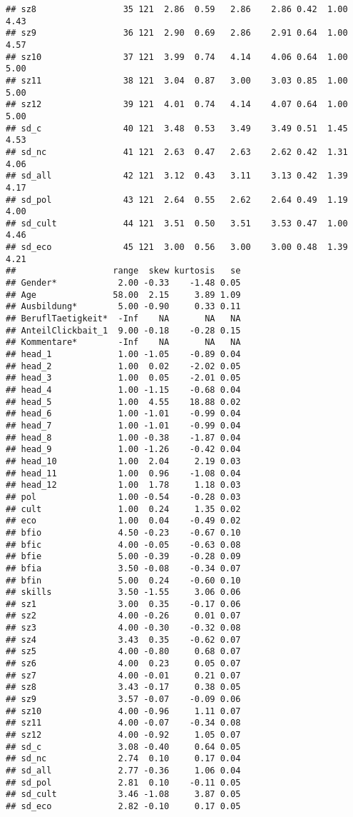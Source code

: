 \documentclass[]{article}
\begin{document}
\begin{verbatim}
## sz8                 35 121  2.86  0.59   2.86    2.86 0.42  1.00  4.43
## sz9                 36 121  2.90  0.69   2.86    2.91 0.64  1.00  4.57
## sz10                37 121  3.99  0.74   4.14    4.06 0.64  1.00  5.00
## sz11                38 121  3.04  0.87   3.00    3.03 0.85  1.00  5.00
## sz12                39 121  4.01  0.74   4.14    4.07 0.64  1.00  5.00
## sd_c                40 121  3.48  0.53   3.49    3.49 0.51  1.45  4.53
## sd_nc               41 121  2.63  0.47   2.63    2.62 0.42  1.31  4.06
## sd_all              42 121  3.12  0.43   3.11    3.13 0.42  1.39  4.17
## sd_pol              43 121  2.64  0.55   2.62    2.64 0.49  1.19  4.00
## sd_cult             44 121  3.51  0.50   3.51    3.53 0.47  1.00  4.46
## sd_eco              45 121  3.00  0.56   3.00    3.00 0.48  1.39  4.21
##                   range  skew kurtosis   se
## Gender*            2.00 -0.33    -1.48 0.05
## Age               58.00  2.15     3.89 1.09
## Ausbildung*        5.00 -0.90     0.33 0.11
## BeruflTaetigkeit*  -Inf    NA       NA   NA
## AnteilClickbait_1  9.00 -0.18    -0.28 0.15
## Kommentare*        -Inf    NA       NA   NA
## head_1             1.00 -1.05    -0.89 0.04
## head_2             1.00  0.02    -2.02 0.05
## head_3             1.00  0.05    -2.01 0.05
## head_4             1.00 -1.15    -0.68 0.04
## head_5             1.00  4.55    18.88 0.02
## head_6             1.00 -1.01    -0.99 0.04
## head_7             1.00 -1.01    -0.99 0.04
## head_8             1.00 -0.38    -1.87 0.04
## head_9             1.00 -1.26    -0.42 0.04
## head_10            1.00  2.04     2.19 0.03
## head_11            1.00  0.96    -1.08 0.04
## head_12            1.00  1.78     1.18 0.03
## pol                1.00 -0.54    -0.28 0.03
## cult               1.00  0.24     1.35 0.02
## eco                1.00  0.04    -0.49 0.02
## bfio               4.50 -0.23    -0.67 0.10
## bfic               4.00 -0.05    -0.63 0.08
## bfie               5.00 -0.39    -0.28 0.09
## bfia               3.50 -0.08    -0.34 0.07
## bfin               5.00  0.24    -0.60 0.10
## skills             3.50 -1.55     3.06 0.06
## sz1                3.00  0.35    -0.17 0.06
## sz2                4.00 -0.26     0.01 0.07
## sz3                4.00 -0.30    -0.32 0.08
## sz4                3.43  0.35    -0.62 0.07
## sz5                4.00 -0.80     0.68 0.07
## sz6                4.00  0.23     0.05 0.07
## sz7                4.00 -0.01     0.21 0.07
## sz8                3.43 -0.17     0.38 0.05
## sz9                3.57 -0.07    -0.09 0.06
## sz10               4.00 -0.96     1.11 0.07
## sz11               4.00 -0.07    -0.34 0.08
## sz12               4.00 -0.92     1.05 0.07
## sd_c               3.08 -0.40     0.64 0.05
## sd_nc              2.74  0.10     0.17 0.04
## sd_all             2.77 -0.36     1.06 0.04
## sd_pol             2.81  0.10    -0.11 0.05
## sd_cult            3.46 -1.08     3.87 0.05
## sd_eco             2.82 -0.10     0.17 0.05
\end{verbatim}
\end{document}
